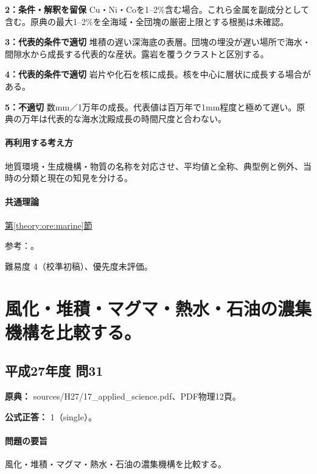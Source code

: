 \noindent\textbf{2：条件・解釈を留保} Cu・Ni・Coを1–2\%含む場合。これら金属を副成分として含む。原典の最大1–2\%を全海域・全団塊の厳密上限とする根拠は未確認。\par

\noindent\textbf{3：代表的条件で適切} 堆積の遅い深海底の表層。団塊の埋没が遅い場所で海水・間隙水から成長する代表的な産状。露岩を覆うクラストと区別する。\par

\noindent\textbf{4：代表的条件で適切} 岩片や化石を核に成長。核を中心に層状に成長する場合がある。\par

\noindent\textbf{5：不適切} 数mm／1万年の成長。代表値は百万年で1mm程度と極めて遅い。原典の万年は代表的な海水沈殿成長の時間尺度と合わない。\par

\paragraph{再利用する考え方} 地質環境・生成機構・物質の名称を対応させ、平均値と全称、典型例と例外、当時の分類と現在の知見を分ける。

\paragraph{共通理論} \hyperref[theory:ore:marine]{第\ref*{theory:ore:marine}節}

\par 参考：\cite{ore50_nodule_ref}。

\par 難易度 4（校準初稿）、優先度未評価。

\section{風化・堆積・マグマ・熱水・石油の濃集機構を比較する。}

\subsection{平成27年度 問31}
\label{q:h27-reg-applied-31}

\noindent\textbf{原典：} sources/H27/17\_applied\_science.pdf、PDF物理12頁。

\textbf{公式正答：} 1（single）。

\paragraph{問題の要旨} 風化・堆積・マグマ・熱水・石油の濃集機構を比較する。

